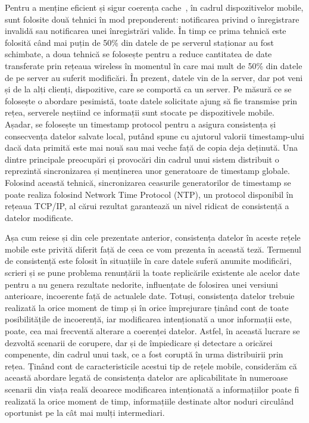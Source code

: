 \documentclass[12pt,a4paper]{report}
\begin{document}
Pentru a menține eficient și sigur coerența cache~\cite{knaesel2009high}, în cadrul dispozitivelor mobile, sunt folosite două tehnici în mod preponderent: notificarea privind o înregistrare invalidă sau notificarea unei înregistrări valide. În timp ce prima tehnică este folosită când mai puțin de 50\% din datele de pe serverul staționar au fost schimbate, a doua tehnică se folosește pentru a reduce cantitatea de date transferate prin rețeaua wireless în momentul în care mai mult de 50\% din datele de pe server au suferit modificări. În prezent, datele vin de la server, dar pot veni și de la alți clienți, dispozitive, care se comportă ca un server. Pe măsură ce se folosește o abordare pesimistă, toate datele solicitate ajung să fie transmise prin rețea, serverele neștiind ce informații sunt stocate pe dispozitivele mobile. Așadar, se folosește un timestamp protocol pentru a asigura consistența și consecvența datelor salvate local, putând spune cu ajutorul valorii timestamp-ului dacă data primită este mai nouă sau mai veche față de copia deja deținută. Una dintre principale preocupări și provocări din cadrul unui sistem distribuit o reprezintă sincronizarea și menținerea unor generatoare de timestamp globale. Folosind această tehnică, sincronizarea ceasurile generatorilor de timestamp se poate realiza folosind Network Time Protocol (NTP), un protocol disponibil în rețeaua TCP/IP, al cărui rezultat garantează un nivel ridicat de consistență a datelor modificate.

Așa cum reiese și din cele prezentate anterior, consistența datelor în aceste rețele mobile este privită diferit față de ceea ce vom prezenta în această teză. Termenul de consistență este folosit în situațiile în care datele suferă anumite modificări, scrieri și se pune problema renunțării la toate replicările existente ale acelor date pentru a nu genera rezultate nedorite, influențate de folosirea unei versiuni anterioare, incoerente față de actualele date. Totuși, consistența datelor trebuie realizată la orice moment de timp și în orice împrejurare ținând cont de toate posibilitățile de incoerență, iar modificarea intenționată a unor informații este, poate, cea mai frecventă alterare a coerenței datelor. Astfel, în această lucrare se dezvoltă scenarii de corupere, dar și de împiedicare și detectare a oricărei compenente, din cadrul unui task, ce a fost coruptă în urma distribuirii prin rețea. Ținând cont de caracteristicile acestui tip de rețele mobile, considerăm că această abordare legată de consistența datelor are aplicabilitate în numeroase scenarii din viața reală deoarece modificarea intenționată a informațiilor poate fi realizată la orice moment de timp, informațiile destinate altor noduri circulând oportunist pe la cât mai mulți intermediari.
\end{document}
